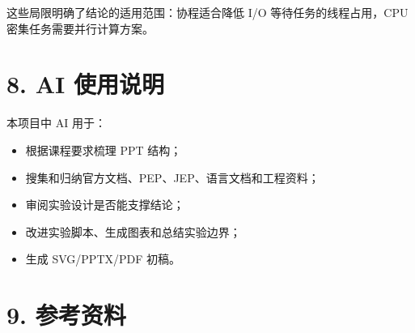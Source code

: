 \documentclass[
  11pt,
  a4paper,
]{article}
\providecommand{\tightlist}{%
  \setlength{\itemsep}{0pt}\setlength{\parskip}{0pt}}
\begin{document}
这些局限明确了结论的适用范围：协程适合降低 I/O 等待任务的线程占用，CPU
密集任务需要并行计算方案。

\section{8. AI 使用说明}\label{ai-ux4f7fux7528ux8bf4ux660e}

本项目中 AI 用于：

\begin{itemize}
\tightlist
\item
  根据课程要求梳理 PPT 结构；
\item
  搜集和归纳官方文档、PEP、JEP、语言文档和工程资料；
\item
  审阅实验设计是否能支撑结论；
\item
  改进实验脚本、生成图表和总结实验边界；
\item
  生成 SVG/PPTX/PDF 初稿。
\end{itemize}

\section{9. 参考资料}\label{ux53c2ux8003ux8d44ux6599}

\begingroup
\footnotesize
\end{document}
